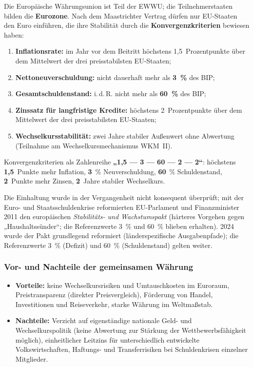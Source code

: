 \documentclass[11pt, a4paper]{article}
\begin{document}
Die Europäische Währungsunion ist Teil der EWWU; die Teilnehmerstaaten bilden die
\textbf{Eurozone}. Nach dem Maastrichter Vertrag dürfen nur EU-Staaten den Euro einführen,
die ihre Stabilität durch die \textbf{Konvergenzkriterien} bewiesen haben:

\begin{enumerate}
  \item \textbf{Inflationsrate:} im Jahr vor dem Beitritt höchstens 1,5~Prozentpunkte über
    dem Mittelwert der drei preisstabilsten EU-Staaten;
  \item \textbf{Nettoneuverschuldung:} nicht dauerhaft mehr als \textbf{3~\%} des BIP;
  \item \textbf{Gesamtschuldenstand:} i.\,d.\,R. nicht mehr als \textbf{60~\%} des BIP;
  \item \textbf{Zinssatz für langfristige Kredite:} höchstens 2~Prozentpunkte über dem
    Mittelwert der drei preisstabilsten EU-Staaten;
  \item \textbf{Wechselkursstabilität:} zwei Jahre stabiler Außenwert ohne Abwertung
    (Teilnahme am Wechselkursmechanismus WKM~II).
\end{enumerate}

\begin{eselsbruecke}
Konvergenzkriterien als Zahlenreihe \textbf{„1,5 --- 3 --- 60 --- 2 --- 2``}: höchstens
\textbf{1,5}~Punkte mehr Inflation, \textbf{3}~\% Neuverschuldung, \textbf{60}~\%
Schuldenstand, \textbf{2}~Punkte mehr Zinsen, \textbf{2}~Jahre stabiler Wechselkurs.
\end{eselsbruecke}

Die Einhaltung wurde in der Vergangenheit nicht konsequent überprüft; mit der Euro- und
Staatsschuldenkrise reformierten EU-Parlament und Finanzminister 2011 den europäischen
\emph{Stabilitäts- und Wachstumspakt} (härteres Vorgehen gegen „Haushaltssünder``; die
Referenzwerte 3~\% und 60~\% blieben erhalten). 2024 wurde der Pakt grundlegend
reformiert (länderspezifische Ausgabenpfade); die Referenzwerte 3~\% (Defizit) und
60~\% (Schuldenstand) gelten weiter.

\subsubsection{Vor- und Nachteile der gemeinsamen Währung}

\begin{itemize}
  \item \textbf{Vorteile:} keine Wechselkursrisiken und Umtauschkosten im Euroraum,
    Preistransparenz (direkter Preisvergleich), Förderung von Handel, Investitionen und
    Reiseverkehr, starke Währung im Weltmaßstab.
  \item \textbf{Nachteile:} Verzicht auf eigenständige nationale Geld- und
    Wechselkurspolitik (keine Abwertung zur Stärkung der Wettbewerbsfähigkeit möglich),
    einheitlicher Leitzins für unterschiedlich entwickelte Volkswirtschaften,
    Haftungs- und Transferrisiken bei Schuldenkrisen einzelner Mitglieder.
\end{itemize}
\end{document}
